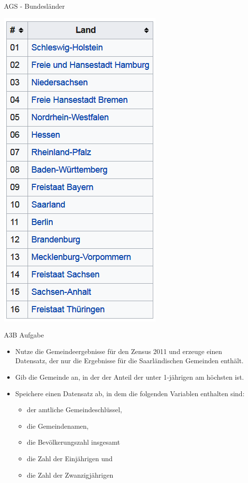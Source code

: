 \documentclass[ignorenonframetext,]{beamer}
\providecommand{\tightlist}{%
  \setlength{\itemsep}{0pt}\setlength{\parskip}{0pt}}
\begin{document}
\begin{frame}{AGS - Bundesländer}

\includegraphics{figure/AGS_BLA.PNG}

\end{frame}

\begin{frame}{A3B Aufgabe}

\begin{itemize}
\tightlist
\item
  Nutze die Gemeindeergebnisse für den Zensus 2011 und erzeuge einen
  Datensatz, der nur die Ergebnisse für die Saarländischen Gemeinden
  enthält.
\item
  Gib die Gemeinde an, in der der Anteil der unter 1-jährigen am
  höchsten ist.
\item
  Speichere einen Datensatz ab, in dem die folgenden Variablen enthalten
  sind:

  \begin{itemize}
  \tightlist
  \item
    der amtliche Gemeindeschlüssel,
  \item
    die Gemeindenamen,\\
  \item
    die Bevölkerungszahl insgesamt
  \item
    die Zahl der Einjährigen und
  \item
    die Zahl der Zwanzigjährigen
  \end{itemize}
\end{itemize}

\end{frame}
\end{document}
